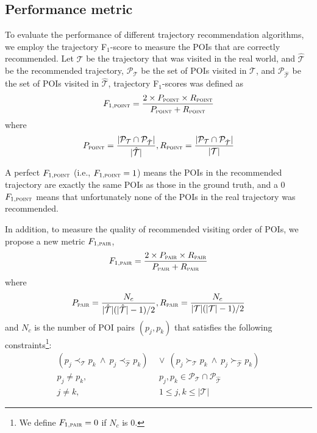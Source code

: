 \subsection{Performance metric}
\label{sec:metric}


To evaluate the performance of different trajectory recommendation algorithms,
we employ the trajectory F$_1$-score\cite{ijcai15} to measure the POIs that are
correctly recommended. Let $\mathcal{T}$ be the trajectory that was visited in the real world,
and $\hat{\mathcal{T}}$ be the recommended trajectory,
$\mathcal{P}_{\mathcal{T}}$ be the set of POIs visited in $\mathcal{T}$,
and $\mathcal{P}_{\hat{\mathcal{T}}}$ be the set of POIs visited in $\hat{\mathcal{T}}$,
trajectory F$_1$-scores was defined as
\begin{displaymath}
F_{1,\textsc{point}} = \frac{2 \times P_{\textsc{point}} \times R_{\textsc{point}}}
                            {P_{\textsc{point}} + R_{\textsc{point}}}
\end{displaymath}
where
\begin{displaymath}
P_{\textsc{point}} = \frac{|\mathcal{P}_{\mathcal{T}} \cap \mathcal{P}_{\hat{\mathcal{T}}}|}
                          {|\hat{\mathcal{T}}|},
R_{\textsc{point}} = \frac{|\mathcal{P}_{\mathcal{T}} \cap \mathcal{P}_{\hat{\mathcal{T}}}|}
                          {|\mathcal{T}|}
\end{displaymath}

A perfect $F_{1,\textsc{point}}$ (i.e., $F_{1,\textsc{point}} = 1$) means the POIs in 
the recommended trajectory are exactly the same POIs as those in the ground truth, 
and a $0$ $F_{1,\textsc{point}}$ means that unfortunately none of the POIs in the 
real trajectory was recommended.

In addition, to measure the quality of recommended visiting order of POIs,
we propose a new metric $F_{1,\textsc{pair}}$,
\begin{displaymath}
F_{1,\textsc{pair}} = \frac{2 \times P_{\textsc{pair}} \times R_{\textsc{pair}}}
                           {P_{\textsc{pair}} + R_{\textsc{pair}}}
\end{displaymath}
where
\begin{displaymath}
P_{\textsc{pair}} = \frac{N_c} {|\hat{\mathcal{T}}|(|\hat{\mathcal{T}}|-1) / 2},
R_{\textsc{pair}} = \frac{N_c} {|\mathcal{T}|(|\mathcal{T}|-1) / 2}
\end{displaymath}
and $N_c$ is the number of POI pairs $(p_j, p_k)$ that satisfies the following
constraints\footnote{We define $F_{1,\textsc{pair}}=0$ if $N_c$ is $0$.}:
\begin{align*}
    (p_j \prec_{\mathcal{T}} p_k ~\land~ p_j \prec_{\hat{\mathcal{T}}} p_k) & ~\lor~
    (p_j \succ_{\mathcal{T}} p_k ~\land~ p_j \succ_{\hat{\mathcal{T}}} p_k) \\
    p_j \ne p_k, &~~ p_j, p_k \in \mathcal{P}_{\mathcal{T}} \cap \mathcal{P}_{\hat{\mathcal{T}}} \\
    j \ne k, &~~ 1 \le j, k \le |\mathcal{T}|
\end{align*}

